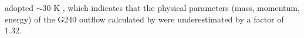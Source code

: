 adopted $\sim$30 K \citep{2009ApJ...696...66Q}, which indicates that the physical parameters (mass, momentum, energy) of the G240 outflow calculated by \citet{2009ApJ...696...66Q} were underestimated by a factor of 1.32. 


